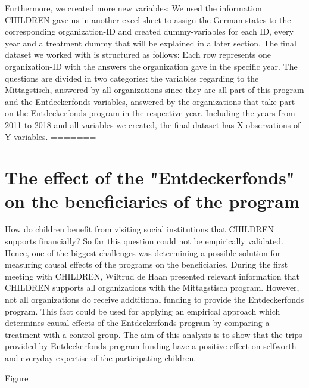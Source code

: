 \documentclass[12pt, a4paper, titlepage]{article}\usepackage[]{graphicx}\usepackage[]{color}
\begin{document}
Furthermore, we created more new variables: We used the information CHILDREN gave us in another excel-sheet to assign the German states to the corresponding organization-ID and created dummy-variables for each ID, every year and a treatment dummy that will be explained in a later section. 
The final dataset we worked with is structured as follows: Each row represents one organization-ID with the answers the organization gave in the specific year. The questions are divided in two categories: the variables regarding to the Mittagstisch, answered by all organizations since they are all part of this program and the Entdeckerfonds variables, answered by the organizations that take part on the Entdeckerfonds program in the respective year. Including the years from 2011 to 2018 and all variables we created, the final dataset has X observations of Y variables.
=======


\section{The effect of the "Entdeckerfonds" on the beneficiaries of the program}

How do children benefit from visiting social institutions that CHILDREN supports financially? So far this question could not be empirically validated. Hence, one of the biggest challenges was determining a possible solution for measuring causal effects of the programs on the beneficiaries. During the first meeting with CHILDREN, Wiltrud de Haan presented relevant information that CHILDREN supports all organizations with the Mittagstisch program. However, not all organizations do receive addtitional funding to provide the Entdeckerfonds program. This fact could be used for applying an empirical approach which determines causal effects of the Entdeckerfonds program by comparing a treatment with a control group. The aim of this analysis is to show that the trips provided by Entdeckerfonds program funding have a positive effect on selfworth and everyday expertise of the participating children. 

Figure\\
\end{document}
